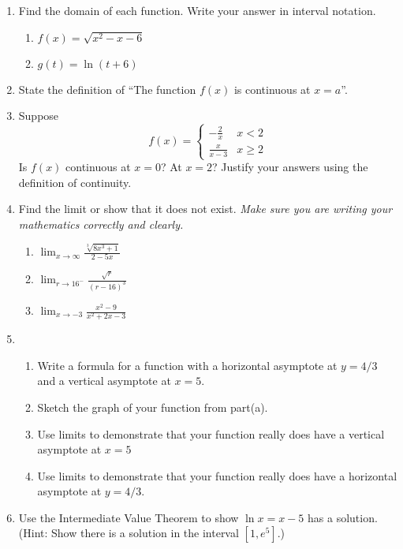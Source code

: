 \documentclass[12pt]{article}
\let\ds\displaystyle
\begin{document}
\begin{enumerate}
\item Find the domain of each function. Write your answer in interval notation.
	\begin{multicols}{2}
	\begin{enumerate}
	\item $f(x)=\sqrt{x^2-x-6}$
	\item $g(t)= \ln (t+6)$
	\end{enumerate}
	\end{multicols}
\vfill

\newpage

\item State the definition of ``The function $f(x)$ is continuous at $x=a$''.
\vskip 1in

\item Suppose
$$
f(x) = \begin{cases} -\frac{2}{x} & x < 2\\
\frac{x}{x-3} & x \ge 2\end{cases}
$$
Is $f(x)$ continuous at $x=0$?  At $x=2$? Justify your answers
using the definition of continuity.
\vfill

\item Find the limit or show that it does not exist. \emph{Make sure you are writing your mathematics correctly and clearly.}
	\begin{enumerate}
	\item $\ds{\lim_{x \to \infty} \frac{\sqrt[3]{8x^3+1}}{2-5x}}$\\
	\vfill
	\item $\ds{\lim_{r \to 16^-} \frac{\sqrt{r}}{(r-16)^3}}$\\
	\vfill
	\item $\ds{\lim_{x \to -3} \frac{x^2-9}{x^2+2x-3}}$\\
	\vfill
	\end{enumerate}

\newpage

\item
\begin{enumerate}
\item Write a formula for a function with a horizontal asymptote at $y=4/3$ and a vertical asymptote at $x=5.$
\vspace{1in}

\item Sketch the graph of your function from part(a).
\vfill
\item Use limits to demonstrate that your function really does have a vertical asymptote at $x=5$
\vfill

\item Use limits to demonstrate that your function really does have a horizontal asymptote at $y=4/3.$
\vfill
\end{enumerate}

\item Use the Intermediate Value Theorem to show $\ln x = x-5$ has a solution. (Hint: Show there is a solution in the interval $[1,e^5].$)
\vspace{2in}

\end{enumerate}
\end{document}
